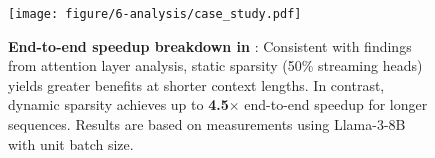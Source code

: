 \begin{figure}[t]
    \centering
    \texttt{[image: figure/6-analysis/case\_study.pdf]}
    \caption{\textbf{End-to-end speedup breakdown in \system}: Consistent with findings from attention layer analysis, static sparsity (50\% streaming heads) yields greater benefits at shorter context lengths. In contrast, dynamic sparsity achieves up to \textbf{4.5$\times$} end-to-end speedup for longer sequences. Results are based on measurements using Llama-3-8B with unit batch size.}
    \label{fig:ana:case_study}
\end{figure}
